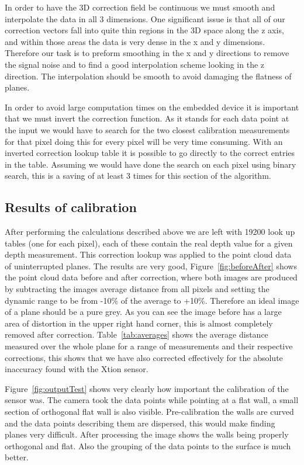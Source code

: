\documentclass[]{article}
\begin{document}
{In order to have the 3D correction field be continuous we must smooth and interpolate the data in all 3 dimensions. One significant issue is that all of our correction vectors fall into quite thin regions in the 3D space along the z axis, and within those areas the data is very dense in the x and y dimensions. Therefore our task is to preform smoothing in the x and y directions to remove the signal noise and to find a good interpolation scheme looking in the z direction. The interpolation should be smooth to avoid damaging the flatness of planes. 

In order to avoid large computation times on the embedded device it is important that we must invert the correction function. As it stands for each data point at the input we would have to search for the two closest calibration measurements for that pixel doing this for every pixel will be very time consuming. With an inverted correction lookup table it is possible to go directly to the correct entries in the table. Assuming we would have done the search on each pixel using binary search, this is a saving of at least 3 times for this section of the algorithm. 

\subsection{Results of calibration} %
 \label{sub:results_of_calibration}
 After performing the calculations described above we are left with 19200 look up tables (one for each pixel), each of these contain the real depth value for a given depth measurement. This correction lookup was applied to the point cloud data of uninterrupted planes. The results are very good, Figure~\ref{fig:beforeAfter} shows the point cloud data before and after correction, where both images are produced by subtracting the images average distance from all pixels and setting the dynamic range to be from -10\% of the average to +10\%. Therefore an ideal image of a plane should be a pure grey. As you can see the image before has a large area of distortion in the upper right hand corner, this is almost completely removed after correction. Table~\ref{tab:averages} shows the average distance measured over the whole plane for a range of measurements and their respective corrections, this shows that we have also corrected effectively for the absolute inaccuracy found with the Xtion sensor. 

 Figure~\ref{fig:outputTest} shows very clearly how important the calibration of the sensor was. The camera took the data points while pointing at a flat wall, a small section of orthogonal flat wall is also visible. Pre-calibration the walls are curved and the data points describing them are dispersed, this would make finding planes very difficult. After processing the image shows the walls being properly orthogonal and flat. Also the grouping of the data points to the surface is much better.


}
\end{document}
